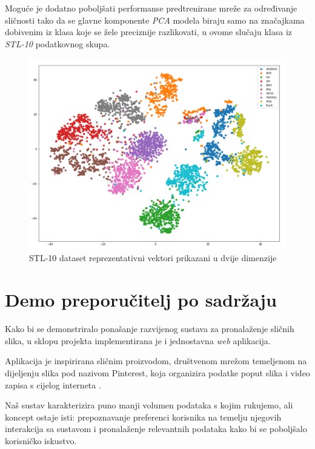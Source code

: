 \documentclass[times, utf8, proizvoljni, numeric]{fer}
\begin{document}
Moguće je dodatno poboljšati performanse predtrenirane mreže za određivanje sličnosti tako da se glavne komponente \textit{PCA} modela biraju samo na značajkama dobivenim iz klasa koje se žele preciznije razlikovati, u ovome slučaju klasa iz \textit{STL-10} podatkovnog skupa.

\begin{figure}[!ht]
	\begin{center}
		\captionsetup{justification=centering}
		\includegraphics[width=1.\textwidth]{./imgs/stl_10_tsne.png}
		\caption{STL-10 dataset reprezentativni vektori prikazani u dvije dimenzije}
		\label{fg:stl_10_tsne}
	\end{center}
\end{figure}

\chapter{Demo preporučitelj po sadržaju}

Kako bi se demonstriralo ponašanje razvijenog sustava za pronalaženje sličnih slika, u sklopu projekta implementirana je i jednostavna \textit{web} aplikacija. 

Aplikacija je inspirirana sličnim proizvodom, društvenom mrežom temeljenom na dijeljenju slika pod nazivom Pinterest, koja organizira podatke poput slika i video zapisa s cijelog interneta \cite{wiki-pintrest}. 

Naš sustav karakterizira puno manji volumen podataka s kojim rukujemo, ali koncept ostaje isti: prepoznavanje preferenci korisnika na temelju njegovih interakcija sa sustavom i pronalaženje relevantnih podataka kako bi se poboljšalo korisničko iskustvo.
\end{document}
